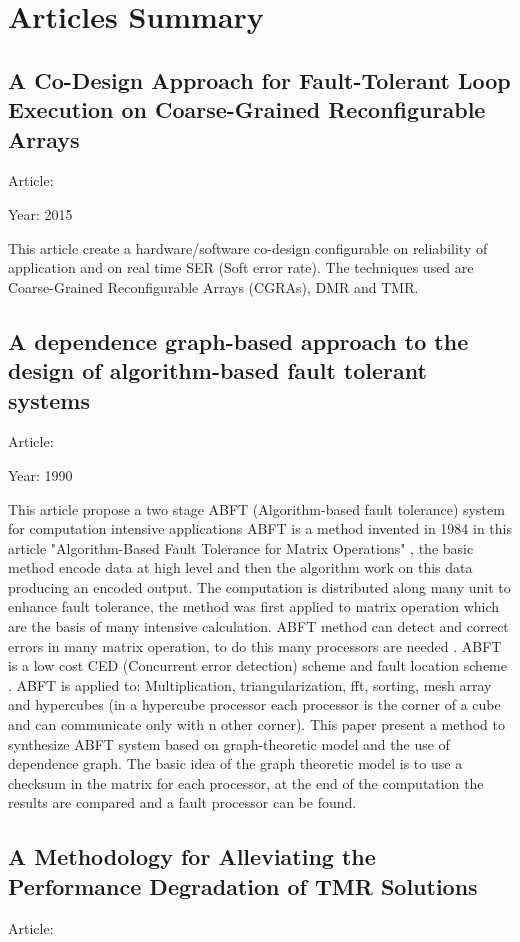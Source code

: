 \chapter{Articles Summary}{
	\label{chap:ArticleSummary}
	\section{A Co-Design Approach for Fault-Tolerant Loop Execution on Coarse-Grained Reconfigurable Arrays }{
		Article: \cite{FT_adaptive_loop_execution}
		
		Year: 2015
		
		This article create a hardware/software co-design configurable on reliability of application and on real time SER (Soft error rate). The techniques used are Coarse-Grained Reconfigurable Arrays (CGRAs), DMR and TMR.
	}
	\section{A dependence graph-based approach to the design of algorithm-based fault tolerant systems}{
		Article: \cite{ABFT_method_graph_based}
		
		Year: 1990		
		
		This article propose a two stage ABFT (Algorithm-based fault tolerance) system for computation intensive applications\cite{ABFT_method_graph_based} ABFT is a method invented in 1984 in this article "Algorithm-Based Fault Tolerance for Matrix Operations" \cite{ABFT_method}, the basic method encode data at high level and then the algorithm work on this data producing an encoded output. The computation is distributed along many unit to enhance fault tolerance, the method was first applied to matrix operation which are the basis of many intensive calculation. ABFT method can detect and correct errors in many matrix operation, to do this many processors are needed \cite{ABFT_method} . ABFT is a low cost CED (Concurrent error detection) scheme and fault location scheme \cite{ABFT_method_graph_based}.
		ABFT is applied to: Multiplication, triangularization, fft, sorting, mesh array and hypercubes (in a hypercube processor each processor is the corner of a cube and can communicate only with n other corner).
		This paper present a method to synthesize ABFT system based on graph-theoretic model and the use of dependence graph. The basic idea of the graph theoretic model is to use a checksum in the matrix for each processor, at the end of the computation the results are compared and a fault processor can be found. 
	}
	\section{A Methodology for Alleviating the Performance Degradation of TMR Solutions}{
		Article: \cite{Alleviate_TMR_preformance_degradation}
		
}}
